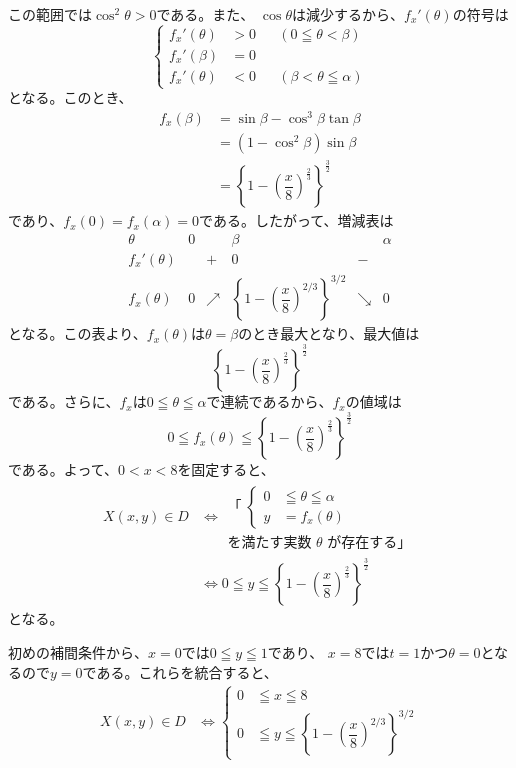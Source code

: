 この範囲では$\cos^2\theta>0$である。また、
$\cos\theta$は減少するから、$f_x'(\theta)$の符号は
\[
\left\{
\begin{aligned}
f_x'(\theta)&>0 &&(0\leqq\theta<\beta)\\
f_x'(\beta)&=0\\
f_x'(\theta)&<0 &&(\beta<\theta\leqq\alpha)
\end{aligned}
\right.
\]
となる。このとき、
\[
\begin{aligned}
f_x(\beta)
&=\sin\beta-\cos^3\beta\tan\beta\\
&=(1-\cos^2\beta)\sin\beta\\
&=\left\{1-\left(\dfrac{x}{8}\right)^{\frac{2}{3}}\right\}^{\frac{3}{2}}
\end{aligned}
\]
であり、$f_x(0)=f_x(\alpha)=0$である。したがって、増減表は
\[
\begin{array}{c|ccccc}
\theta&0&&\beta&&\alpha\\ \hline
f_x'(\theta)&&+&0&-&\\ \hline
f_x(\theta)&0&\nearrow&
\left\{1-\left(\dfrac{x}{8}\right)^{2/3}\right\}^{3/2}
&\searrow&0
\end{array}
\]
となる。この表より、$f_x(\theta)$は$\theta=\beta$のとき最大となり、最大値は
\[
\left\{1-\left(\dfrac{x}{8}\right)^{\frac{2}{3}}\right\}^{\frac{3}{2}}
\]
である。さらに、$f_x$は$0\leqq\theta\leqq\alpha$で連続であるから、$f_x$の値域は
\[
0\leqq f_x(\theta)\leqq
\left\{1-\left(\dfrac{x}{8}\right)^{\frac{2}{3}}\right\}^{\frac{3}{2}}
\]
である。よって、$0<x<8$を固定すると、
\[
\begin{aligned}
X(x,y)\in D
&\Longleftrightarrow
\begin{gathered}
\text{「}\;
\left\{
\begin{aligned}
0&\leqq\theta\leqq\alpha\\
y&=f_x(\theta)
\end{aligned}
\right.\\
\text{を満たす実数 }\theta\text{ が存在する」}
\end{gathered}\\
&\Longleftrightarrow
0\leqq y\leqq
\left\{1-\left(\dfrac{x}{8}\right)^{\frac{2}{3}}\right\}^{\frac{3}{2}}
\end{aligned}
\]
となる。

初めの補間条件から、$x=0$では$0\leqq y\leqq1$であり、
$x=8$では$t=1$かつ$\theta=0$となるので$y=0$である。これらを統合すると、
\[
\begin{aligned}
X(x,y)\in D
&\Longleftrightarrow
\left\{
\begin{aligned}
0&\leqq x\leqq8\\
0&\leqq y\leqq
\left\{1-\left(\dfrac{x}{8}\right)^{2/3}\right\}^{3/2}
\end{aligned}
\right.
\end{aligned}
\]

